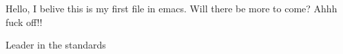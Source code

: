 Hello, I belive this is my first file in emacs. Will there be more to come? Ahhh fuck off!!

Leader in the standards
